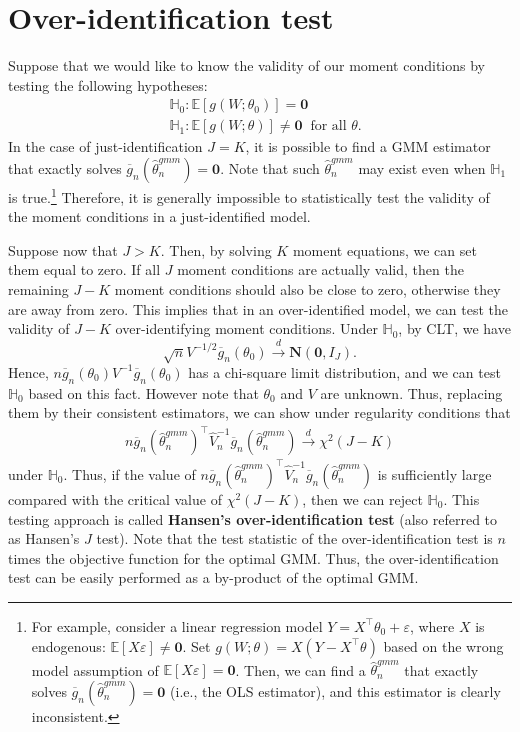 \documentclass[10.5pt, A4paper, openany, uplatex]{book}
\newcommand{\mbf}{\mathbf}
\newcommand{\mbb}{\mathbb}
\newcommand{\eps}{\varepsilon}
\newcommand{\E}{\mathbb{E}}
\renewcommand{\hat}{\widehat}
\renewcommand{\bar}{\overline}
\numberwithin{equation}{section}
\begin{document}
\section{Over-identification test}

Suppose that we would like to know the validity of our moment conditions by testing the following hypotheses:
\begin{align*}
	& \mbb{H}_0: \E[g(W; \theta_0)] = \mbf{0}\\
	& \mbb{H}_1: \E[g(W; \theta)] \neq \mbf{0} \;\; \text{for all $\theta$}.
\end{align*}
In the case of just-identification $J = K$, it is possible to find a GMM estimator that exactly solves $\bar g_n(\hat \theta_n^{gmm}) = \mbf{0}$.
Note that such $\hat \theta_n^{gmm}$ may exist even when $\mbb{H}_1$ is true.\footnote{
	For example, consider a linear regression model $Y = X^\top \theta_0 + \eps$, where $X$ is endogenous: $\E[X \eps] \neq \mbf{0}$.
	Set $g(W; \theta) = X(Y - X^\top\theta)$ based on the wrong model assumption of $\E[X \eps] = \mbf{0}$.
	Then, we can find a $\hat \theta_n^{gmm}$ that exactly solves $\bar g_n(\hat \theta_n^{gmm}) = \mbf{0}$ (i.e., the OLS estimator), and this estimator is clearly inconsistent.
	}
Therefore, it is generally impossible to statistically test the validity of the moment conditions in a just-identified model.

Suppose now that $J > K$.
Then, by solving $K$ moment equations, we can set them equal to zero.
If all $J$ moment conditions are actually valid, then the remaining $J-K$ moment conditions should also be close to zero, otherwise they are away from zero.
This implies that in an over-identified model, we can test the validity of $J - K$ over-identifying moment conditions.
Under $\mbb{H}_0$, by CLT, we have
\[
	\sqrt{n} V^{-1/2} \bar g_n (\theta_0) \overset{d}{\to} \mbf{N}(\mbf{0}, I_J).
\]
Hence, $n \bar g_n (\theta_0) V^{-1} \bar g_n (\theta_0)$ has a chi-square limit distribution, and we can test $\mbb{H}_0$ based on this fact.
However note that $\theta_0$ and $V$ are unknown.
Thus, replacing them by their consistent estimators, we can show under regularity conditions that
\begin{align*}
	n \bar{g}_n(\hat\theta_n^{gmm})^\top \hat V_n^{-1} \bar{g}_n(\hat\theta_n^{gmm}) \overset{d}{\to} \chi^2(J - K)
\end{align*}
under $\mbb{H}_0$.
Thus, if the value of $n \bar{g}_n(\hat\theta_n^{gmm})^\top \hat V_n^{-1} \bar{g}_n(\hat\theta_n^{gmm})$ is sufficiently large compared with the critical value of $\chi^2(J - K)$, then we can reject $\mbb{H}_0$.
This testing approach is called \textbf{Hansen's over-identification test} (also referred to as Hansen's $J$ test).
Note that the test statistic of the over-identification test is $n$ times the objective function for the optimal GMM.
Thus, the over-identification test can be easily performed as a by-product of the optimal GMM.
\end{document}
